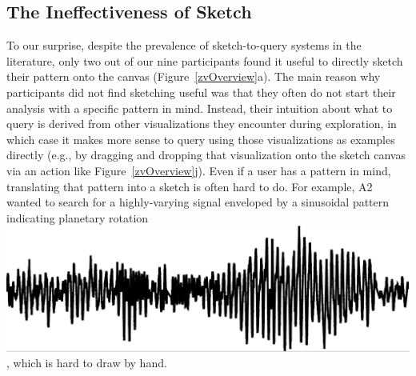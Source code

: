 \subsection{The Ineffectiveness of Sketch}
\par To our surprise, 
despite the prevalence of sketch-to-query 
systems in the literature,  only two out of our nine participants 
found it useful to directly
sketch their pattern onto the canvas (Figure~\ref{zvOverview}a). %
The main reason why participants 
did not find sketching useful was that 
they often do not start their analysis with a specific pattern in mind. 
Instead, their intuition about what to query is derived
from other visualizations they encounter
during exploration, in which case it makes
more sense to query using those visualizations
as examples directly (e.g., by dragging and dropping
that visualization onto the sketch canvas via an action like
Figure~\ref{zvOverview}j). 
Even if a user has a pattern in mind,
translating that pattern into a sketch is often hard
to do. For example, 
A2 wanted to search for a highly-varying signal 
enveloped by a sinusoidal pattern indicating 
planetary rotation \includegraphics[width=2\baselineskip,keepaspectratio]{figures/impossible_sketch.png}, which is hard to draw by hand.
